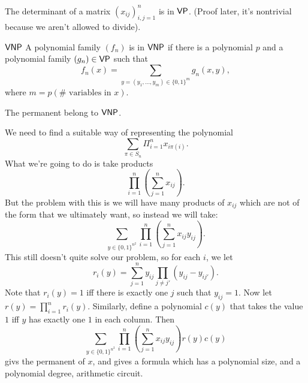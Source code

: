 \documentclass{article}
\begin{document}
\begin{ex*}
    The determinant of a matrix $(x_{ij})_{i,j=1}^{n}$ is in $\mathsf{VP}$. (Proof later, it's nontrivial because we aren't allowed to divide).
\end{ex*}
\begin{fancydefine}{$\mathsf{VNP}$}
    A polynomial family $(f_{n})$ is in $\mathsf{VNP}$ if there is a polynomial $p$ and a polynomial family $(g_{n}) \in \mathsf{VP}$ such that \[ f_{n}(x) = \sum_{y = (y_{1},\dots, y_{m}) \in\{0,1\}^{m}} g_{n}(x,y),\]
    where $m=p(\# \text{ variables in $x$})$.
\end{fancydefine}
\begin{ex*}
    The permanent belong to $\mathsf{VNP}$.
\end{ex*}
\proof We need to find a suitable way of representing the polynomial \[ \sum_{\pi \in S_{n}} \Pi_{i=1}^{n} x_{i \pi(i)}.\]
What we're going to do is take products \[ \prod_{i=1}^{n}\left(\sum_{j=1}^{n} x_{ij}\right).\] But the problem with this is we will have many products of $x_{ij}$ which are not of the form that we ultimately want, so instead we will take: \[ \sum_{y \in \{0,1\}^{n^{2}}} \prod_{i=1}^{n} \left( \sum_{j=1}^{n} x_{ij} y_{ij} \right). \] This still doesn't quite solve our problem, so for each $i$, we let \[r_{i}(y) = \sum_{j=1}^{n} y_{ij} \prod_{j \neq j'} (y_{ij} - y_{ij'}).\]
Note that $r_{i}(y)=1$ iff there is exactly one $j$ such that $y_{ij} = 1$. Now let $r(y) = \prod_{i=1}^{n} r_{i}(y)$. Similarly, define a polynomial $c(y)$ that takes the value $1$ iff $y$ has exactly one $1$ in each column. Then \[\sum_{y \in \{0,1\}^{n^{2}}} \prod_{i=1}^{n} \left( \sum_{j=1}^{n} x_{ij} y_{ij} \right) r(y)c(y)\]   givs the permanent of $x$, and gives a formula which has a polynomial size, and a polynomial degree, arithmetic circuit. \endproof 
\end{document}
